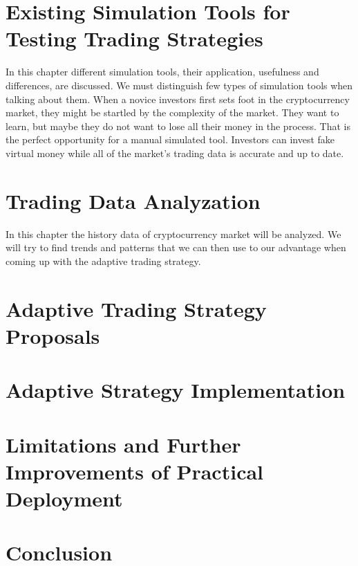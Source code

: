 \chapter{Existing Simulation Tools for Testing Trading Strategies}
\label{simulation-tools}

In this chapter different simulation tools, their application, usefulness and differences, are discussed. We must distinguish few types of simulation tools when talking about them. When a novice investors first sets foot in the cryptocurrency market, they might be startled by the complexity of the market. They want to learn, but maybe they do not want to lose all their money in the process. That is the perfect opportunity for a manual simulated tool. Investors can invest fake virtual money while all of the market's trading data is accurate and up to date.

\chapter{Trading Data Analyzation}
\label{data-analyzation}

In this chapter the history data of cryptocurrency market will be analyzed. We will try to find trends and patterns that we can then use to our advantage when coming up with the adaptive trading strategy.

\chapter{Adaptive Trading Strategy Proposals}
\label{proposal}

\chapter{Adaptive Strategy Implementation}
\label{implementation}

\chapter{Limitations and Further Improvements of Practical Deployment}
\label{limitations}

\chapter{Conclusion}
\label{conclusion}
